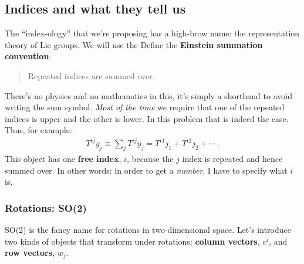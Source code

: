 \documentclass[12pt]{article}
\renewcommand{\vec}[1]{\mathbf{#1}} %
\begin{document}
\subsection{Indices and what they tell us}

The ``index-ology'' that we're proposing has a high-brow name: the representation theory of Lie groups. We will use the Define the \textbf{Einstein summation convention}:
\begin{quote}
	Repeated indices are summed over. 
\end{quote}
 There's no physics and no mathematics in this, it's simply a shorthand to avoid writing the sum symbol. \emph{Most of the time} we require that one of the repeated indices is upper and the other is lower. In this problem that is indeed the case. Thus, for example:
 \begin{align}
 	T^{ij}y_j \equiv \sum_j T^{ij}y_j = T^{i1}j_1 + T^{i2}j_2 + \cdots \ .
 \end{align}
 This object has one \textbf{free index}, $i$, because the $j$ index is repeated and hence summed over. In other words: in order to get a \emph{number}, I have to specify what $i$ is. 


\subsubsection{Rotations: SO(2)}

SO(2) is the fancy name for rotations in two-dimensional space. Let's introduce two kinds of objects that transform under rotations: \textbf{column vectors}, $v^i$, and \textbf{row vectors}, $w_j$.%
\end{document}
